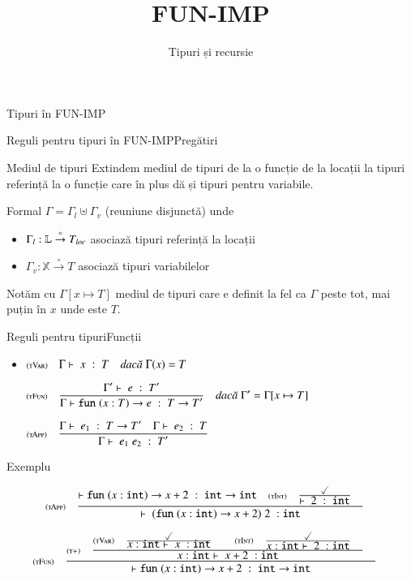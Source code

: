 \documentclass[xcolor=pdftex,romanian,colorlinks]{beamer}
\title[PD---Funcții II]{FUN-IMP}
\subtitle{Tipuri și recursie}
\begin{document}
\maketitle

\begin{section}{Tipuri în FUN-IMP}
\begin{frame}{Reguli pentru tipuri în FUN-IMP}{Pregătiri}
\begin{block}{Mediul de tipuri}
Extindem mediul de tipuri de la o funcție de la locații la tipuri referință
la o funcție care în plus dă și tipuri pentru variabile.


Formal $\Gamma = \Gamma_l \uplus \Gamma_v$ (reuniune disjunctă) unde
\begin{itemize}
\item    $\Gamma_l : \mathbb{L} \stackrel\circ\rightarrow T_{\it loc}$ asociază tipuri referință la locații
\item    $\Gamma_v : \mathbb{X} \stackrel\circ\rightarrow T$ asociază tipuri variabilelor
\end{itemize}

Notăm cu $\Gamma[x\mapsto T]$ mediul de tipuri care e definit la fel ca $\Gamma$ peste tot, mai puțin în $x$ unde este $T$.
\end{block}
\end{frame}

\begin{frame}{Reguli pentru tipuri}{Funcții}
\begin{itemize}
\item[] $\reg[tVar]{\tjud{x}{T}}{}{\Gamma(x) = T}$

\vitem[] 
$\displaystyle\reg[tFun]{\tjud{\Sfun (x : T) \rightarrow e}{T \rightarrow T'}}{\tjud[\Gamma']{e}{T'}}{\Gamma' = \Gamma[x\mapsto T]}$

\vitem[]
$\displaystyle\reg[tApp]{\tjud{e_1\; e_2}{T'}}{\tjud{e_1}{T \rightarrow T'} \si \tjud{e_2}{T}}{}$
\end{itemize}
\end{frame}

\begin{frame}{Exemplu}{}


\[\displaystyle\reg[tApp]{
  \tjud[]{{(\Sfun (x:{\Sint}) \rightarrow x + 2)\; 2}}{\Sint}
}{
  \tjud[]{\Sfun (x:{\Sint}) \rightarrow x + 2}{{\Sint} \rightarrow {\Sint}}
    \si 
    \reg[tInt]{
      \tjud[]{2}{{\Sint}}
    }{
      \done
    }{}
}{}\]

\[
  \reg[tFun]{
    \tjud[]{\Sfun (x:{\Sint}) \rightarrow x + 2}{{\Sint} \rightarrow {\Sint}}
  }{
    \reg[t+]{
      \tjud[x:{\Sint}]{x+2}{\Sint}
  }{
      \reg[tVar]{
        \tjud[x:{\Sint}]{x}{\Sint}
      }{
        \done
      }{} 
      \si 
      \reg[tInt]{
        \tjud[x:{\Sint}]{2}{\Sint}
      }{
        \done
      }{}
  }{} 
  }{}
\]


\end{frame}
\end{section}
\end{document}
